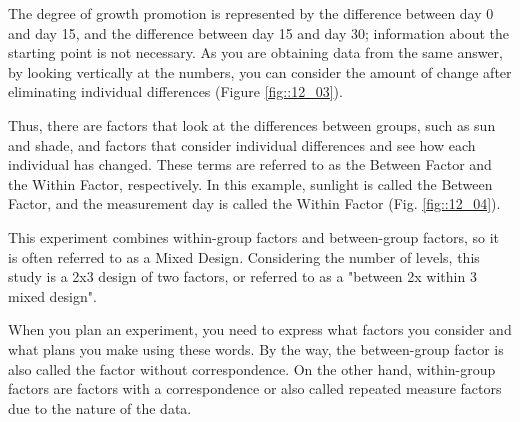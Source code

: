 \documentclass{ltjbook}
\begin{document}
The degree of growth promotion is represented by the difference between day 0 and day 15, and the difference between day 15 and day 30; information about the starting point is not necessary. As you are obtaining data from the same answer, by looking vertically at the numbers, you can consider the amount of change after eliminating individual differences (Figure \ref{fig::12_03}).


Thus, there are factors that look at the differences between groups, such as sun and shade, and factors that consider individual differences and see how each individual has changed. These terms are referred to as the Between Factor and the Within Factor, respectively. In this example, sunlight is called the Between Factor, and the measurement day is called the Within Factor (Fig. \ref{fig::12_04}).

This experiment combines within-group factors and between-group factors, so it is often referred to as a Mixed Design. Considering the number of levels, this study is a 2x3 design of two factors, or referred to as a "between 2x within 3 mixed design".


When you plan an experiment, you need to express what factors you consider and what plans you make using these words. By the way, the between-group factor is also called the factor without correspondence. On the other hand, within-group factors are factors with a correspondence or also called repeated measure factors due to the nature of the data.
\end{document}
